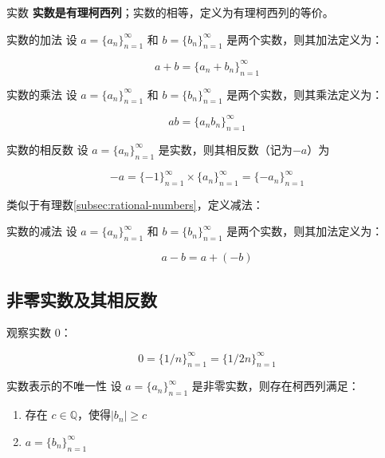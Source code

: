 \begin{definition}{实数}{}
	\textbf{{\heiti 实数是有理柯西列}}；实数的相等，定义为有理柯西列的等价。
\end{definition}

\begin{definition}{实数的加法}{}
	设 $a=\{a_n\}^\infty_{n=1}$ 和 $b=\{b_n\}^\infty_{n=1}$ 是两个实数，则其加法定义为：
	
	$$
	a+b = \{a_n+b_n\}^\infty_{n=1}
	$$
\end{definition}

\begin{definition}{实数的乘法}{}
	设 $a=\{a_n\}^\infty_{n=1}$ 和 $b=\{b_n\}^\infty_{n=1}$ 是两个实数，则其乘法定义为：
	
	$$
	ab = \{a_n b_n\}^\infty_{n=1}
	$$
\end{definition}

\begin{definition}{实数的相反数}{}
	设 $a = \{a_n\}^\infty_{n=1}$ 是实数，则其相反数（记为$-a$）为
	
	$$
	-a= \{-1\}^\infty_{n=1} \times \{a_n\}^\infty_{n=1} = \{-a_n\}^\infty_{n=1}
	$$
\end{definition}

类似于有理数\ref{subsec:rational-numbers}，定义减法：

\begin{definition}{实数的减法}{}
	设 $a=\{a_n\}^\infty_{n=1}$ 和 $b=\{b_n\}^\infty_{n=1}$ 是两个实数，则其加法定义为：
	
	$$
	a-b = a + (-b)
	$$
\end{definition}

\subsection{非零实数及其相反数}

\begin{example} 观察实数 $0$：

$$
0 = \{1/n\}_{n=1}^\infty = \{1/2n\}_{n=1}^\infty
$$
\end{example}

\begin{theorem}{实数表示的不唯一性}{}
	设 $a=\{a_n\}_{n=1}^\infty$ 是非零实数，则存在柯西列满足：
	\begin{enumerate}
		\item 存在 $c\in \mathbb Q$，使得$|b_n|\ge c$
		\item $a=\{b_n\}^\infty_{n=1}$
	\end{enumerate}
\end{theorem}

